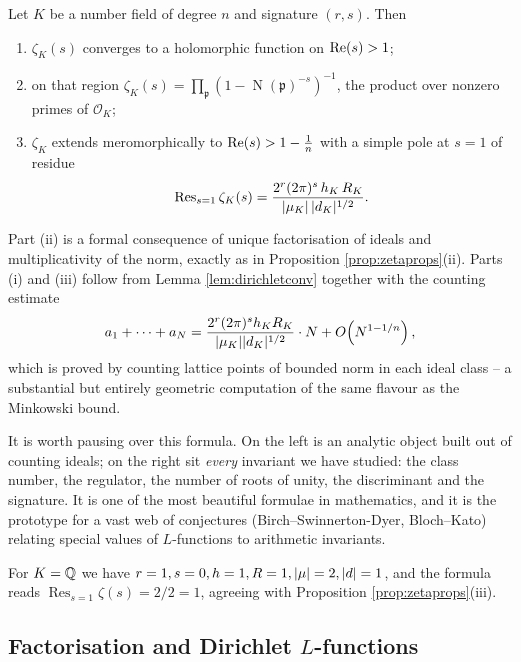 \documentclass[a4paper]{scrartcl}
\renewcommand{\OO}{\mathcal{O}}
\newcommand{\Nm}{\operatorname{N}}
\newcommand{\Res}{\operatorname{Res}}
\newcommand{\fp}{\mathfrak{p}}
\begin{document}
\begin{theorem}\label{thm:acnf}
	Let $K$ be a number field of degree $n$ and signature $(r,s)$. Then
	\begin{enumerate}[label=(\roman*)]
		\item $\zeta_K(s)$ converges to a holomorphic function on $\operatorname{Re}(s)>1$;
		\item on that region $\displaystyle\zeta_K(s) = \prod_{\fp}\left(1-\Nm(\fp)^{-s}\right)^{-1}$, the product over nonzero primes of $\OO_K$;
		\item $\zeta_K$ extends meromorphically to $\operatorname{Re}(s) > 1 - \tfrac1n$ with a simple pole at $s = 1$ of residue
		$$\Res_{s=1}\zeta_K(s) = \frac{2^{r}(2\pi)^{s}\,h_K\,R_K}{\abs{\mu_K}\,\abs{d_K}^{1/2}}.$$
	\end{enumerate}
\end{theorem}

Part (ii) is a formal consequence of unique factorisation of ideals and multiplicativity of the norm, exactly as in Proposition \ref{prop:zetaprops}(ii). Parts (i) and (iii) follow from Lemma \ref{lem:dirichletconv} together with the counting estimate
$$a_1+\dots+a_N = \frac{2^{r}(2\pi)^{s}h_KR_K}{\lvert\mu_K\rvert\lvert d_K\rvert^{1/2}}\cdot N + O\!\left(N^{1-1/n}\right),$$
which is proved by counting lattice points of bounded norm in each ideal class -- a substantial but entirely geometric computation of the same flavour as the Minkowski bound.

It is worth pausing over this formula. On the left is an analytic object built out of counting ideals; on the right sit \emph{every} invariant we have studied: the class number, the regulator, the number of roots of unity, the discriminant and the signature. It is one of the most beautiful formulae in mathematics, and it is the prototype for a vast web of conjectures (Birch--Swinnerton-Dyer, Bloch--Kato) relating special values of $L$-functions to arithmetic invariants.

\begin{example}
	For $K = \mathbb{Q}$ we have $r = 1, s= 0, h = 1, R = 1, \lvert\mu\rvert = 2, \lvert d\rvert = 1$, and the formula reads $\Res_{s=1}\zeta(s) = 2/2 = 1$, agreeing with Proposition \ref{prop:zetaprops}(iii).
\end{example}

\subsection{Factorisation and Dirichlet $L$-functions}
\end{document}
